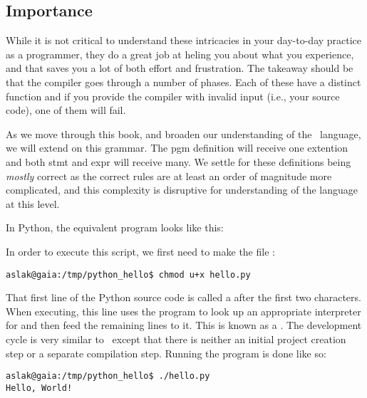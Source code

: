 
\subsection{Importance}

While it is not critical to understand these intricacies in your day-to-day practice as a programmer, they do a great job at heling you  about what you experience, and that saves you a lot of both effort and frustration. The takeaway should be that the compiler goes through a number of phases. Each of these have a distinct function and if you provide the compiler with invalid input (i.e., your source code), one of them will fail.

As we move through this book, and broaden our understanding of the \csharp\ language, we will extend on this grammar. The pgm definition will receive one extention and both stmt and expr will receive many. We settle for these definitions being \textsl{mostly} correct as the correct rules are at least an order of magnitude more complicated, and this complexity is disruptive for understanding of the language at this level.

\label{sec:first:python}

In Python, the equivalent program looks like this:


In order to execute this script, we first need to make the file :
\begin{verbatim}
aslak@gaia:/tmp/python_hello$ chmod u+x hello.py
\end{verbatim}

That first line of the Python source code is called a  after the first two characters. When executing, this line uses the  program to look up an appropriate interpreter for  and then feed the remaining lines to it. This is known as a . The development cycle is very similar to \csharp\ except that there is neither an initial project creation step or a separate compilation step. Running the program is done like so:

\begin{verbatim}
aslak@gaia:/tmp/python_hello$ ./hello.py
Hello, World!
\end{verbatim}

